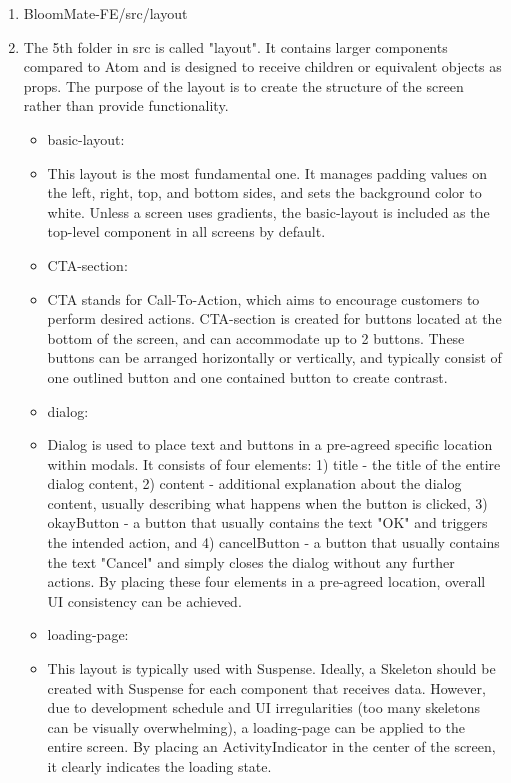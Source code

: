 \documentclass[conference, a4paper]{IEEEtran}
\begin{document}
\begin{enumerate}
\begin{enumerate}
    \item BloomMate-FE/src/layout
    \item[] The 5th folder in src is called "layout". It contains larger components compared to Atom and is designed to receive children or equivalent objects as props. The purpose of the layout is to create the structure of the screen rather than provide functionality.

    \begin{itemize}
        \item basic-layout: 
        \item[] This layout is the most fundamental one. It manages padding values on the left, right, top, and bottom sides, and sets the background color to white. Unless a screen uses gradients, the basic-layout is included as the top-level component in all screens by default. \\

        \item CTA-section: 
        \item[] CTA stands for Call-To-Action, which aims to encourage customers to perform desired actions. CTA-section is created for buttons located at the bottom of the screen, and can accommodate up to 2 buttons. These buttons can be arranged horizontally or vertically, and typically consist of one outlined button and one contained button to create contrast. \\

        \item dialog: 
        \item[] Dialog is used to place text and buttons in a pre-agreed specific location within modals. It consists of four elements: 1) title - the title of the entire dialog content, 2) content - additional explanation about the dialog content, usually describing what happens when the button is clicked, 3) okayButton - a button that usually contains the text "OK" and triggers the intended action, and 4) cancelButton - a button that usually contains the text "Cancel" and simply closes the dialog without any further actions. By placing these four elements in a pre-agreed location, overall UI consistency can be achieved. \\

        \item loading-page: 
        \item[] This layout is typically used with Suspense. Ideally, a Skeleton should be created with Suspense for each component that receives data. However, due to development schedule and UI irregularities (too many skeletons can be visually overwhelming), a loading-page can be applied to the entire screen. By placing an ActivityIndicator in the center of the screen, it clearly indicates the loading state. \\


\end{itemize}
\end{enumerate}
\end{enumerate}
\end{document}
